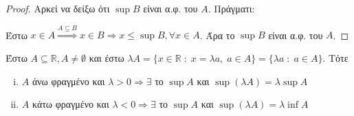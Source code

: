 \documentclass[main.tex]{subfiles}
\begin{document}
\begin{proof}
\item {}
    Αρκεί να δείξω ότι $ \sup B $ είναι α.φ. του $A$. Πράγματι:

    Έστω $ x \in A \overset{A \subseteq B}{\Rightarrow } x \in B \Rightarrow 
    x \leq \sup B, \forall x \in A$. Άρα το $ \sup B $ είναι α.φ. του $A$.
\end{proof}

\begin{prop}
    Έστω $ A \subseteq \mathbb{R}, A \neq \emptyset $ και έστω $ \lambda A = 
    \{ x \in \mathbb{R} \; : \; x = \lambda a, \; a \in A \} = \{ \lambda a \; : \; 
    a \in A\} $. Τότε
    \begin{enumerate}[i)]
        \item $ A $ άνω φραγμένο και $ \lambda >0 \Rightarrow \exists $ το $ \sup A $
            και $ \sup (\lambda A) = \lambda \sup A $
        \item $ A $ κάτω φραγμένο και $ \lambda <0 \Rightarrow \exists $ το $ \sup A $
            και $ \sup (\lambda A) = \lambda \inf A $
    \end{enumerate}
\end{prop}
\end{document}
